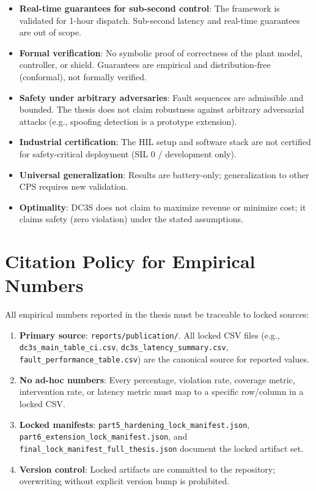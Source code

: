 \begin{itemize}
\item \textbf{Real-time guarantees for sub-second control}: The framework is validated for 1-hour dispatch. Sub-second latency and real-time guarantees are out of scope.
\item \textbf{Formal verification}: No symbolic proof of correctness of the plant model, controller, or shield. Guarantees are empirical and distribution-free (conformal), not formally verified.
\item \textbf{Safety under arbitrary adversaries}: Fault sequences are admissible and bounded. The thesis does not claim robustness against arbitrary adversarial attacks (e.g., spoofing detection is a prototype extension).
\item \textbf{Industrial certification}: The HIL setup and software stack are not certified for safety-critical deployment (SIL 0 / development only).
\item \textbf{Universal generalization}: Results are battery-only; generalization to other CPS requires new validation.
\item \textbf{Optimality}: DC3S does not claim to maximize revenue or minimize cost; it claims safety (zero violation) under the stated assumptions.
\end{itemize}

\section{Citation Policy for Empirical Numbers}
\label{sec:citation-policy}

All empirical numbers reported in the thesis must be traceable to locked sources:

\begin{enumerate}
\item \textbf{Primary source}: \texttt{reports/publication/}. All locked CSV files (e.g., \texttt{dc3s\_main\_table\_ci.csv}, \texttt{dc3s\_latency\_summary.csv}, \texttt{fault\_performance\_table.csv}) are the canonical source for reported values.
\item \textbf{No ad-hoc numbers}: Every percentage, violation rate, coverage metric, intervention rate, or latency metric must map to a specific row/column in a locked CSV.
\item \textbf{Locked manifests}: \texttt{part5\_hardening\_lock\_manifest.json}, \texttt{part6\_extension\_lock\_manifest.json}, and \texttt{final\_lock\_manifest\_full\_thesis.json} document the locked artifact set.
\item \textbf{Version control}: Locked artifacts are committed to the repository; overwriting without explicit version bump is prohibited.
\end{enumerate}

